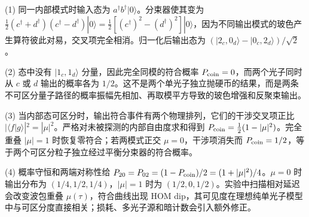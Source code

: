 (1) 同一内部模式时输入态为 \(a^\dagger b^\dagger|0\rangle\)。分束器使其变为 \(\tfrac12(c^\dagger+d^\dagger)(c^\dagger-d^\dagger)|0\rangle=\tfrac12[(c^\dagger)^2-(d^\dagger)^2]|0\rangle\)，因为不同输出模式的玻色产生算符彼此对易，交叉项完全相消。归一化后输出态为 \((|2_c,0_d\rangle-|0_c,2_d\rangle)/\sqrt2\)。

(2) 态中没有 \(|1_c,1_d\rangle\) 分量，因此完全同模的符合概率 \(P_{\rm coin}=0\)，而两个光子同时从 \(c\) 或 \(d\) 输出的概率各为 \(1/2\)。这不是两个单光子独立抛硬币的结果，而是两条不可区分量子路径的概率振幅先相加、再取模平方导致的玻色增强和反聚束输出。

(3) 当内部态可区分时，输出符合事件有两个物理排列，它们的干涉交叉项正比 \(|\langle f|g\rangle|^2=|\mu|^2\)。严格对未被探测的内部自由度求和得到 \(P_{\rm coin}=\frac12(1-|\mu|^2)\)。完全重叠 \(|\mu|=1\) 时恢复零符合；若两模式正交 \(\mu=0\)，干涉项消失而 \(P_{\rm coin}=1/2\)，等于两个可区分粒子独立经过平衡分束器的符合概率。

(4) 概率守恒和两端对称性给 \(P_{20}=P_{02}=(1-P_{\rm coin})/2=(1+|\mu|^2)/4\)。\(\mu=0\) 时输出分布为 \((1/4,1/2,1/4)\)，\(|\mu|=1\) 时为 \((1/2,0,1/2)\)。实验中扫描相对延迟会改变波包重叠 \(\mu(\tau)\)，符合曲线出现 HOM dip，其可见度在理想纯单光子模型中与可区分度直接相关；损耗、多光子源和暗计数会引入额外修正。
